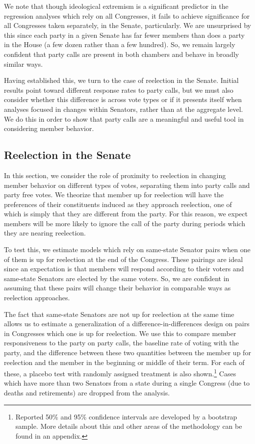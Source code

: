 \documentclass[12pt]{article}
\begin{document}
We note that though ideological extremism is a significant predictor in the regression analyses which rely on all Congresses, it fails to achieve significance for all Congresses taken separately, in the Senate, particularly. We are unsurprised by this since each party in a given Senate has far fewer members than does a party in the House (a few dozen rather than a few hundred). So, we remain largely confident that party calls are present in both chambers and behave in broadly similar ways. 

Having established this, we turn to the case of reelection in the Senate. Initial results point toward different response rates to party calls, but we must also consider whether this difference is across vote types or if it presents itself when analyses focused in changes within Senators, rather than at the aggregate level. We do this in order to show that party calls are a meaningful and useful tool in considering member behavior.

\subsection{Reelection in the Senate}

In this section, we consider the role of proximity to reelection in changing member behavior on different types of votes, separating them into party calls and party free votes. We theorize that member up for reelection will have the preferences of their constituents induced as they approach reelection, one of which is simply that they are different from the party. For this reason, we expect members will be more likely to ignore the call of the party during periods which they are nearing reelection.

To test this, we estimate models which rely on same-state Senator pairs when one of them is up for reelection at the end of the Congress. These pairings are ideal since an expectation is that members will respond according to their voters and same-state Senators are elected by the same voters. So, we are confident in assuming that these pairs will change their behavior in comparable ways as reelection approaches. 

The fact that same-state Senators are not up for reelection at the same time allows us to estimate a generalization of a difference-in-differences design on pairs in Congresses which one is up for reelection. We use this to compare member responsiveness to the party on party calls, the baseline rate of voting with the party, and the difference between these two quantities between the member up for reelection and the member in the beginning or middle of their term. For each of these, a placebo test with randomly assigned treatment is also shown.\footnote{Reported 50\% and 95\% confidence intervals are developed by a bootstrap sample. More details about this and other areas of the methodology can be found in an appendix.} Cases which have more than two Senators from a state during a single Congress (due to deaths and retirements) are dropped from the analysis.
\end{document}
